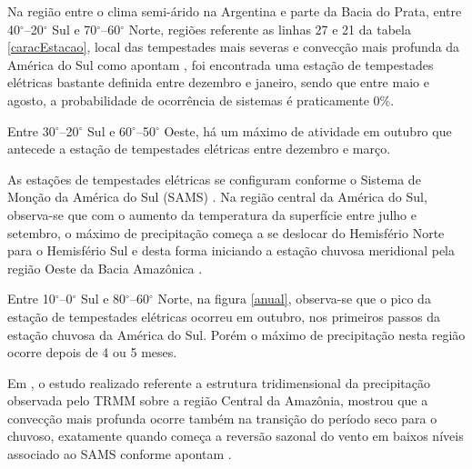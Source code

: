  

Na região entre o clima semi-árido na Argentina e parte da Bacia do Prata, entre 40$^{\circ}$--20$^{\circ}$ Sul e 70$^{\circ}$--60$^{\circ}$ Norte,  regiões referente as linhas 27 e 21 da tabela \ref{caracEstacao}, local das tempestades mais severas e convecção mais profunda da América do Sul como apontam , foi encontrada uma estação de tempestades elétricas bastante definida entre dezembro e janeiro, sendo que entre maio e agosto, a probabilidade de ocorrência de sistemas é praticamente 0\%.%

Entre 30$^{\circ}$--20$^{\circ}$ Sul e 60$^{\circ}$--50$^{\circ}$ Oeste, há um máximo de atividade em outubro que antecede a estação de tempestades elétricas entre dezembro e março. 

As estações de tempestades elétricas se configuram conforme o Sistema de Monção da América do Sul (SAMS) . Na região central da América do Sul, observa-se que com o aumento da temperatura da superfície entre julho e setembro, o máximo de precipitação começa a se deslocar do Hemisfério Norte para o Hemisfério Sul e desta forma iniciando a estação chuvosa meridional pela região Oeste da Bacia Amazônica \cite{Zhou1998,grimm2003nino,reboita2010regimes,Marengo2012, bombardi2008variabilidade}.

Entre 10$^{\circ}$--0$^{\circ}$ Sul e 80$^{\circ}$--60$^{\circ}$ Norte,  na figura \ref{anual}, observa-se que o pico da estação de tempestades elétricas ocorreu em outubro, nos primeiros passos da estação chuvosa da América do Sul. Porém o máximo de precipitação nesta região ocorre depois de 4 ou 5 meses. 

Em , o estudo realizado referente a estrutura tridimensional da precipitação observada pelo TRMM sobre a região Central da Amazônia, mostrou que a convecção mais profunda ocorre também na transição do período seco para o chuvoso, exatamente quando começa a reversão sazonal do vento em baixos níveis associado ao SAMS conforme apontam .


